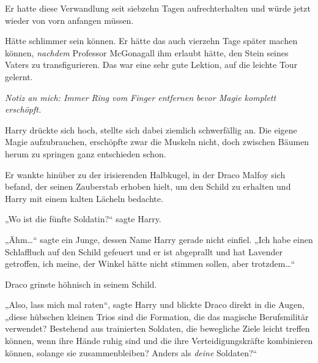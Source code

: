Er hatte diese Verwandlung seit siebzehn Tagen aufrechterhalten und würde jetzt wieder von vorn anfangen müssen.

Hätte schlimmer sein können. Er hätte das auch vierzehn Tage später machen können, \emph{nachdem} Professor McGonagall ihm erlaubt hätte, den Stein seines Vaters zu transfigurieren. Das war eine sehr gute Lektion, auf die leichte Tour gelernt.

\emph{Notiz an mich: Immer Ring vom Finger entfernen bevor Magie komplett erschöpft.}

Harry drückte sich hoch, stellte sich dabei ziemlich schwerfällig an. Die eigene Magie aufzubrauchen, erschöpfte zwar die Muskeln nicht, doch zwischen Bäumen herum zu springen ganz entschieden schon.

Er wankte hinüber zu der irisierenden Halbkugel, in der Draco Malfoy sich befand, der seinen Zauberstab erhoben hielt, um den Schild zu erhalten und Harry mit einem kalten Lächeln bedachte.

„Wo ist die fünfte Soldatin?“ sagte Harry.

„Ähm…“ sagte ein Junge, dessen Name Harry gerade nicht einfiel. „Ich habe einen Schlaffluch auf den Schild gefeuert und er ist abgeprallt und hat Lavender getroffen, ich meine, der Winkel hätte nicht stimmen sollen, aber trotzdem…“

Draco grinste höhnisch in seinem Schild.

„Also, lass mich mal raten“, sagte Harry und blickte Draco direkt in die Augen, „diese hübschen kleinen Trios sind die Formation, die das magische Berufsmilitär verwendet? Bestehend aus trainierten Soldaten, die bewegliche Ziele leicht treffen können, wenn ihre Hände ruhig sind und die ihre Verteidigungskräfte kombinieren können, solange sie zusammenbleiben? Anders als \emph{deine} Soldaten?“

